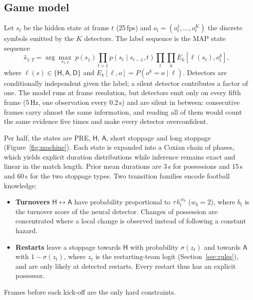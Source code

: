 \documentclass[10pt,a4paper]{article}
\newcommand{\lH}{\mathsf{H}}
\newcommand{\lA}{\mathsf{A}}
\newcommand{\lD}{\mathsf{D}}
\begin{document}
\subsection{Game model}
Let $s_t$ be the hidden state at frame $t$ (25\,fps) and $o_t=(o_t^1,\dots,o_t^K)$ the discrete
symbols emitted by the $K$ detectors. The label sequence is the MAP state sequence
\begin{equation}
\hat s_{1:T}=\arg\max_{s_{1:T}} \; p(s_1)\prod_{t>1} p(s_t\mid s_{t-1}, t)\prod_{t}\prod_{k} E_k\!\left[\ell(s_t),o_t^k\right],
\end{equation}
where $\ell(s)\in\{\lH,\lA,\lD\}$ and $E_k[\ell,o]=P(o^k=o\mid\ell)$. Detectors are conditionally
independent given the label; a silent detector contributes a factor of one. The model runs at frame
resolution, but detectors emit only on every fifth frame (5\,Hz, one observation every 0.2\,s) and
are silent in between: consecutive frames carry almost the same information, and reading all of them
would count the same evidence five times and make every detector overconfident.

Per half, the states are PRE, $\lH$, $\lA$, short stoppage and long stoppage
(Figure~\ref{fig:machine}). Each state is expanded into a Coxian chain of phases, which yields
explicit duration distributions while inference remains exact and linear in the match length.
Prior mean durations are 3\,s for possessions and 15\,s and 60\,s for the two stoppage types. Two
transition families encode football knowledge:
\begin{itemize}
\item \textbf{Turnovers} $\lH\leftrightarrow\lA$ have probability proportional to $\tau\,b_t^{\,w_b}$
  ($w_b=2$), where $b_t$ is the turnover score of the neural detector. Changes of possession are
  concentrated where a local change is observed instead of following a constant hazard.
\item \textbf{Restarts} leave a stoppage towards $\lH$ with probability $\sigma(z_t)$ and towards
  $\lA$ with $1-\sigma(z_t)$, where $z_t$ is the restarting-team logit (Section~\ref{sec:rules}),
  and are only likely at detected restarts. Every restart thus has an explicit possessor.
\end{itemize}
Frames before each kick-off are the only hard constraints.
\end{document}
